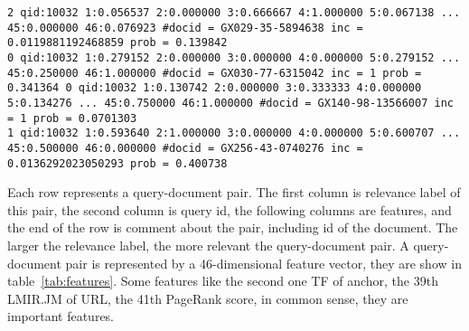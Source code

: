 \begin{lstlisting}
2 qid:10032 1:0.056537 2:0.000000 3:0.666667 4:1.000000 5:0.067138 ... 45:0.000000 46:0.076923 #docid = GX029-35-5894638 inc = 0.0119881192468859 prob = 0.139842 
0 qid:10032 1:0.279152 2:0.000000 3:0.000000 4:0.000000 5:0.279152 ... 45:0.250000 46:1.000000 #docid = GX030-77-6315042 inc = 1 prob = 0.341364 0 qid:10032 1:0.130742 2:0.000000 3:0.333333 4:0.000000 5:0.134276 ... 45:0.750000 46:1.000000 #docid = GX140-98-13566007 inc = 1 prob = 0.0701303 
1 qid:10032 1:0.593640 2:1.000000 3:0.000000 4:0.000000 5:0.600707 ... 45:0.500000 46:0.000000 #docid = GX256-43-0740276 inc = 0.0136292023050293 prob = 0.400738 

\end{lstlisting}
Each row represents a query-document pair. The first column is relevance label of this pair, the second column is query id, the following columns are features, and the end of the row is comment about the pair, including id of the document. The larger the relevance label, the more relevant the query-document pair. A query-document pair is represented by a 46-dimensional feature vector, they are show in table~\ref{tab:features}. Some features like the second one TF of anchor, the 39th LMIR.JM of URL, the 41th PageRank score, in common sense, they are important features. 
